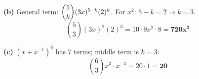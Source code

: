 \documentclass[addpoints]{exam}
\begin{document}
\begin{questions}
\begin{solution}[9cm]
\textbf{(b)} General term: $\dbinom{5}{k}(3x)^{5-k}(2)^k$.
For $x^2$: $5-k=2 \Rightarrow k=3$.
\[
\binom{5}{3}(3x)^2(2)^3 = 10 \cdot 9x^2 \cdot 8 = \mathbf{720x^2}
\]

\textbf{(c)} $(x+x^{-1})^6$ has 7 terms; middle term is $k=3$:
\[
\binom{6}{3}x^3 \cdot x^{-3} = 20 \cdot 1 = \mathbf{20}
\]
\end{solution}

\end{questions}
\end{document}
